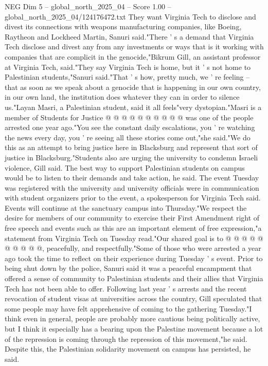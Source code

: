 \begin{textsample}{NEG Dim 5 – global\_north\_2025\_04 – Score 1.00 – global\_north\_2025\_04/124176472.txt}
They want Virginia Tech to disclose and divest its connections with weapons manufacturing companies, like Boeing, Raytheon and Lockheed Martin, Sanuri said."There ' s a demand that Virginia Tech disclose and divest any from any investments or ways that is it working with companies that are complicit in the genocide,"Bikrum Gill, an assistant professor at Virginia Tech, said."They say Virginia Tech is home, but it ' s not home to Palestinian students,"Sanuri said."That ' s how, pretty much, we ' re feeling -- that as soon as we speak about a genocide that is happening in our own country, in our own land, the institution does whatever they can in order to silence us."Layan Masri, a Palestinian student, said it all feels"very dystopian."Masri is a member of Students for Justice @ @ @ @ @ @ @ @ @ @ was one of the people arrested one year ago."You see the constant daily escalations, you ' re watching the news every day, you ' re seeing all these stories come out,"she said."We do this as an attempt to bring justice here in Blacksburg and represent that sort of justice in Blacksburg."Students also are urging the university to condemn Israeli violence, Gill said.
The best way to support Palestinian students on campus would be to listen to their demands and take action, he said.
The event Tuesday was registered with the university and university officials were in communication with student organizers prior to the event, a spokesperson for Virginia Tech said.
Events will continue at the sanctuary campus into Thursday."We respect the desire for members of our community to exercise their First Amendment right of free speech and events such as this are an important element of free expression,"a statement from Virginia Tech on Tuesday read."Our shared goal is to @ @ @ @ @ @ @ @ @ @, peacefully, and respectfully."Some of those who were arrested a year ago took the time to reflect on their experience during Tuesday ' s event.
Prior to being shut down by the police, Sanuri said it was a peaceful encampment that offered a sense of community to Palestinian students and their allies that Virginia Tech has not been able to offer.
Following last year ' s arrests and the recent revocation of student visas at universities across the country, Gill speculated that some people may have felt apprehensive of coming to the gathering Tuesday."I think even in general, people are probably more cautious being politically active, but I think it especially has a bearing upon the Palestine movement because a lot of the repression is coming through the repression of this movement,"he said.
Despite this, the Palestinian solidarity movement on campus has persisted, he said.

\end{textsample}
